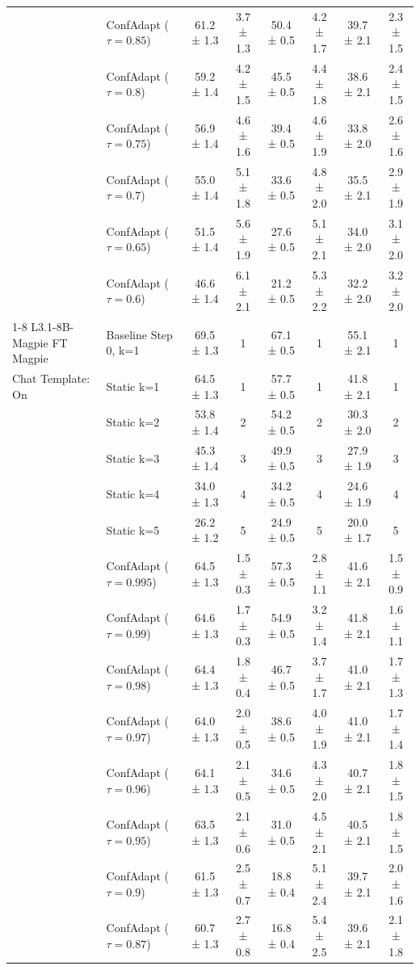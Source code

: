 \documentclass{article}
\theoremstyle{plain}
\theoremstyle{definition}
\theoremstyle{remark}
\begin{document}
\begin{table}[h!]
\begin{tabular}{llcccccc}
 & ConfAdapt ($\tau=0.85$) & 61.2 ± 1.3 & 3.7 ± 1.3 & 50.4 ± 0.5 & 4.2 ± 1.7 & 39.7 ± 2.1 & 2.3 ± 1.5 \\
 & ConfAdapt ($\tau=0.8$) & 59.2 ± 1.4 & 4.2 ± 1.5 & 45.5 ± 0.5 & 4.4 ± 1.8 & 38.6 ± 2.1 & 2.4 ± 1.5 \\
 & ConfAdapt ($\tau=0.75$) & 56.9 ± 1.4 & 4.6 ± 1.6 & 39.4 ± 0.5 & 4.6 ± 1.9 & 33.8 ± 2.0 & 2.6 ± 1.6 \\
 & ConfAdapt ($\tau=0.7$) & 55.0 ± 1.4 & 5.1 ± 1.8 & 33.6 ± 0.5 & 4.8 ± 2.0 & 35.5 ± 2.1 & 2.9 ± 1.9 \\
 & ConfAdapt ($\tau=0.65$) & 51.5 ± 1.4 & 5.6 ± 1.9 & 27.6 ± 0.5 & 5.1 ± 2.1 & 34.0 ± 2.0 & 3.1 ± 2.0 \\
 & ConfAdapt ($\tau=0.6$) & 46.6 ± 1.4 & 6.1 ± 2.1 & 21.2 ± 0.5 & 5.3 ± 2.2 & 32.2 ± 2.0 & 3.2 ± 2.0 \\
\cline{1-8}
L3.1-8B-Magpie FT Magpie & Baseline Step 0, k=1 & 69.5 ± 1.3 & 1 & 67.1 ± 0.5 & 1 & 55.1 ± 2.1 & 1 \\
 Chat Template: On & Static k=1 & 64.5 ± 1.3 & 1 & 57.7 ± 0.5 & 1 & 41.8 ± 2.1 & 1 \\
 & Static k=2 & 53.8 ± 1.4 & 2 & 54.2 ± 0.5 & 2 & 30.3 ± 2.0 & 2 \\
 & Static k=3 & 45.3 ± 1.4 & 3 & 49.9 ± 0.5 & 3 & 27.9 ± 1.9 & 3 \\
 & Static k=4 & 34.0 ± 1.3 & 4 & 34.2 ± 0.5 & 4 & 24.6 ± 1.9 & 4 \\
 & Static k=5 & 26.2 ± 1.2 & 5 & 24.9 ± 0.5 & 5 & 20.0 ± 1.7 & 5 \\
 & ConfAdapt ($\tau=0.995$) & 64.5 ± 1.3 & 1.5 ± 0.3 & 57.3 ± 0.5 & 2.8 ± 1.1 & 41.6 ± 2.1 & 1.5 ± 0.9 \\
 & ConfAdapt ($\tau=0.99$) & 64.6 ± 1.3 & 1.7 ± 0.3 & 54.9 ± 0.5 & 3.2 ± 1.4 & 41.8 ± 2.1 & 1.6 ± 1.1 \\
 & ConfAdapt ($\tau=0.98$) & 64.4 ± 1.3 & 1.8 ± 0.4 & 46.7 ± 0.5 & 3.7 ± 1.7 & 41.0 ± 2.1 & 1.7 ± 1.3 \\
 & ConfAdapt ($\tau=0.97$) & 64.0 ± 1.3 & 2.0 ± 0.5 & 38.6 ± 0.5 & 4.0 ± 1.9 & 41.0 ± 2.1 & 1.7 ± 1.4 \\
 & ConfAdapt ($\tau=0.96$) & 64.1 ± 1.3 & 2.1 ± 0.5 & 34.6 ± 0.5 & 4.3 ± 2.0 & 40.7 ± 2.1 & 1.8 ± 1.5 \\
 & ConfAdapt ($\tau=0.95$) & 63.5 ± 1.3 & 2.1 ± 0.6 & 31.0 ± 0.5 & 4.5 ± 2.1 & 40.5 ± 2.1 & 1.8 ± 1.5 \\
 & ConfAdapt ($\tau=0.9$) & 61.5 ± 1.3 & 2.5 ± 0.7 & 18.8 ± 0.4 & 5.1 ± 2.4 & 39.7 ± 2.1 & 2.0 ± 1.6 \\
 & ConfAdapt ($\tau=0.87$) & 60.7 ± 1.3 & 2.7 ± 0.8 & 16.8 ± 0.4 & 5.4 ± 2.5 & 39.6 ± 2.1 & 2.1 ± 1.8 \\

\end{tabular}
\end{table}
\end{document}
